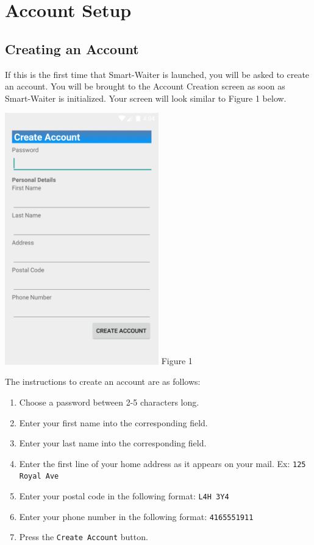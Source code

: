 \documentclass[12pt, titlepage]{article}
\begin{document}
\section{Account Setup}
\subsection{Creating an Account}
If this is the first time that Smart-Waiter is launched, you will be asked to create an account. You will be brought to the Account Creation screen as soon as Smart-Waiter is initialized. Your screen will look similar to Figure 1 below. 

\begin{center}
\includegraphics[width=0.5\textwidth]{accountCreation.png}
\linebreak Figure 1
\end{center}

The instructions to create an account are as follows: 
\begin{enumerate}
	\item Choose a password between 2-5 characters long.
	\item Enter your first name into the corresponding field.
	\item Enter your last name into the corresponding field.
	\item Enter the first line of your home address as it appears on your mail. Ex: \texttt{125 Royal Ave}
	\item Enter your postal code in the following format: \texttt{L4H 3Y4}
	\item Enter your phone number in the following format: \texttt{4165551911}
	\item Press the \texttt{Create Account} button.
\end{enumerate}
\end{document}
